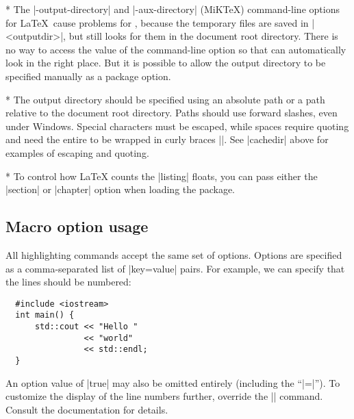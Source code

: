 \begin{paracol}{2}
\switchcolumn

\switchcolumn[0]*%
The |-output-directory| and |-aux-directory| (MiKTeX) command-line options for \LaTeX\ cause problems for , because the  temporary files are saved in |<outputdir>|, but  still looks for them in the document root directory.  There is no way to access the value of the command-line option so that  can automatically look in the right place.  But it is possible to allow the output directory to be specified manually as a package option.
\switchcolumn

\switchcolumn[0]*%
The output directory should be specified using an absolute path or a path relative to the document root directory.  Paths should use forward slashes, even under Windows.  Special characters must be escaped, while spaces require quoting and need the entire  to be wrapped in curly braces |{}|.  See |cachedir| above for examples of escaping and quoting.

\switchcolumn

\switchcolumn[0]*%
To control how \LaTeX{} counts the |listing| floats, you can pass either the
|section| or |chapter| option when loading the  package.
\switchcolumn


\end{paracol}


\subsection{Macro option usage}

All  highlighting commands accept the same set of options.
Options are specified as a comma-separated list of |key=value| pairs.
For example, we can specify that the lines should be numbered:

\begin{example}
  \begin{verbatim}
  #include <iostream>
  int main() {
      std::cout << "Hello "
                << "world"
                << std::endl;
  }
  \end{verbatim}
\end{example}

An option value of |true| may also be omitted entirely (including the ``|=|'').
To customize the display of the line numbers further, override the |\theFancyVerbLine| command.
Consult the  documentation for details.


